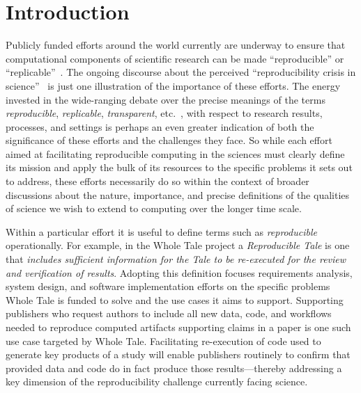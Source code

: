 
\section{Introduction}

Publicly funded efforts around the world currently are underway to
	ensure that computational components of scientific research
	can be made ``reproducible'' or
    ``replicable''~\cite{brinckman2019computing, chard2019, jimenez_popperci:_2017,
    jimenez_popper_2017, that_sciunits:_2017, essawy_integrating_2018, Binder_2018,
    rampin_reprozip:_2016, DBLP:journals/corr/abs-1808-01406, oliveira_supporting_2018}.
The ongoing discourse about the perceived ``reproducibility crisis in science''~\cite{donoho_reproducible_2009,baker_2016,fanelli_opinion:_2018}
	is just one illustration of the importance of these efforts.
The energy invested in the wide-ranging debate over the precise meanings of the
	terms \emph{reproducible}, \emph{replicable},
        \emph{transparent}, etc.\
        \cite{drummond2009replicability,carolegoble2016what,freire2016reproducibilitya,goodman2016what,ioannidis2017reproducibility,herouxtoward,plesser2018reproducibility,barba2018terminologies,committeeonreproducibilityandreplicabilityinscience2019reproducibility}, with
	respect to research results, processes, and settings is perhaps an even greater indication of
	both the significance of these efforts and the challenges they face.
So while each effort aimed at facilitating reproducible computing in the
	sciences must clearly define its mission and apply the bulk of its resources
	to the specific problems it sets out to address, these efforts necessarily do
	so within the context of broader discussions about the nature, importance,
	and precise definitions of the qualities of science we wish to extend to computing
	over the longer time scale.

Within a particular effort it is useful to define terms such as \emph{reproducible} operationally.
For example, in the Whole Tale project \cite{WT2019,brinckman2019computing} a \emph{Reproducible Tale} is one
	that \emph{includes sufficient information for the Tale to be re-executed for the review
	and verification of results}.
Adopting this definition focuses requirements analysis, system design,
	and software implementation efforts on the specific problems Whole Tale is funded to solve
	and the use cases it aims to support.
Supporting publishers who request authors to include all new data,
	code, and workflows needed to reproduce computed artifacts supporting
	claims in a paper is one such use case targeted by Whole Tale.
Facilitating re-execution of code used to generate
	key products of a study will enable publishers routinely to confirm that
	provided data and code do in fact produce those results---thereby addressing
	a key dimension of the reproducibility challenge currently facing science.

